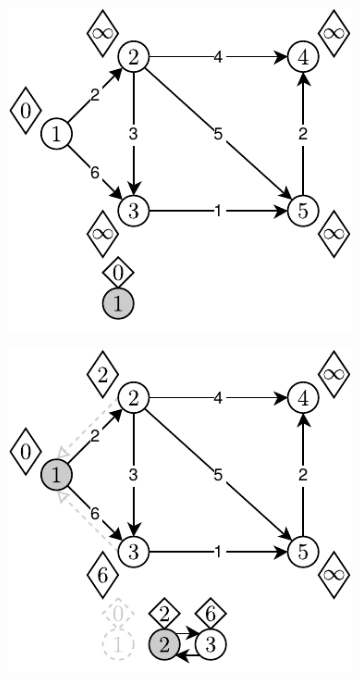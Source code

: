 \begin{figure}[!h]
	\centering
	\begin{subfigure}[b]{0.3\textwidth}
		\includegraphics[width=\textwidth]{Chapter_II/DIJKSTRA-DLList/a.pdf}
		\caption{}
	\end{subfigure}%
	\begin{subfigure}[b]{0.3\textwidth}
		\includegraphics[width=\textwidth]{Chapter_II/DIJKSTRA-DLList/b.pdf}

\end{subfigure}
\end{figure}
